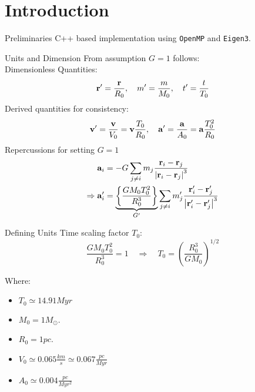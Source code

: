 \section{Introduction} %

\begin{frame}{Preliminaries}
	C++ based implementation using \texttt{OpenMP} and \texttt{Eigen3}.
\end{frame}

\begin{frame}{Units and Dimension}
	From assumption $G=1$ follows: \\
	Dimensionless Quantities:
	\begin{equation}
		\vb{r}^{\prime}=\frac{\vb{r}}{R_0}, \quad m^{\prime}=\frac{m}{M_0}, \quad t^{\prime}=\frac{t}{T_0}
	\end{equation}
	Derived quantities for consistency:
	\begin{equation}
		\begin{aligned}
			\vb{v}^{\prime} = \frac{\vb{v}}{V_0} = \vb{v} \frac{T_0}{R_0}, \quad \vb{a}^{\prime} = \frac{\vb{a}}{A_0} = \vb{a} \frac{T_0^2}{R_0}
		\end{aligned}
	\end{equation}
	Repercussions for setting $G = 1$
	\begin{equation}
		\begin{aligned}
			\vb{a}_i                      & =-G \sum_{j\neq i} m_j \frac{\vb{r}_i-\vb{r}_j}{\left|\vb{r}_i-\vb{r}_j\right|^3} \\
			\Rightarrow \vb{a}_i^{\prime} & =\underbrace{\left\{\frac{G M_0
					T_0^2}{R_0^3}\right\}}_{G^{\prime}} \sum_{j\neq i} m_j^\prime
			\frac{\vb{r}_i^\prime-\vb{r}^\prime_j}{\left|\vb{r}^\prime_i-\vb{r}^\prime_j\right|^3}
		\end{aligned}
	\end{equation}
\end{frame}

\begin{frame}{Defining Units}
	Time scaling factor $T_0$:
	\begin{equation}
		\frac{G M_0 T_0^2}{R_0^3}=1 \quad \Rightarrow \quad T_0=\left(\frac{R_0^3}{G M_0}\right)^{1 / 2}
	\end{equation}\bigskip

	Where:
	\begin{itemize}
		\item $T_0 \simeq 14.91 Myr$
		\item $M_0 =  1 M_\odot$.
		\item $R_0 =  1 pc$.
		\item $V_0 \simeq 0.065 \frac{km}{s} \simeq 0.067 \frac{pc}{Myr}$
		\item $A_0 \simeq 0.004 \frac{pc}{Myr^2}$
	\end{itemize}
\end{frame}
